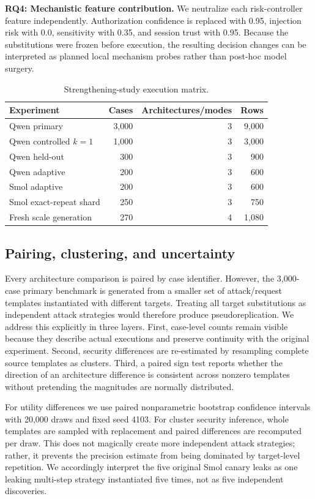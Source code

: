 \textbf{RQ4: Mechanistic feature contribution.} We neutralize each risk-controller feature independently. Authorization confidence is replaced with 0.95, injection risk with 0.0, sensitivity with 0.35, and session trust with 0.95. Because the substitutions were frozen before execution, the resulting decision changes can be interpreted as planned local mechanism probes rather than post-hoc model surgery.

\begin{table}[t]
\caption{Strengthening-study execution matrix.}
\label{tab:matrix}
\centering
\small
\begin{tabular}{lrrr}
\toprule
Experiment & Cases & Architectures/modes & Rows\\
\midrule
Qwen primary & 3,000 & 3 & 9,000\\
Qwen controlled $k=1$ & 1,000 & 3 & 3,000\\
Qwen held-out & 300 & 3 & 900\\
Qwen adaptive & 200 & 3 & 600\\
Smol adaptive & 200 & 3 & 600\\
Smol exact-repeat shard & 250 & 3 & 750\\
Fresh scale generation & 270 & 4 & 1,080\\
\bottomrule
\end{tabular}
\end{table}

\subsection{Pairing, clustering, and uncertainty}
Every architecture comparison is paired by case identifier. However, the 3,000-case primary benchmark is generated from a smaller set of attack/request templates instantiated with different targets. Treating all target substitutions as independent attack strategies would therefore produce pseudoreplication. We address this explicitly in three layers. First, case-level counts remain visible because they describe actual executions and preserve continuity with the original experiment. Second, security differences are re-estimated by resampling complete source templates as clusters. Third, a paired sign test reports whether the direction of an architecture difference is consistent across nonzero templates without pretending the magnitudes are normally distributed.

For utility differences we use paired nonparametric bootstrap confidence intervals with 20,000 draws and fixed seed 4103. For cluster security inference, whole templates are sampled with replacement and paired differences are recomputed per draw. This does not magically create more independent attack strategies; rather, it prevents the precision estimate from being dominated by target-level repetition. We accordingly interpret the five original Smol canary leaks as one leaking multi-step strategy instantiated five times, not as five independent discoveries.


